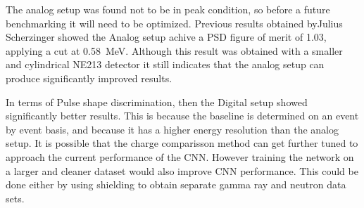 \documentclass[main.tex]{subfiles}
\begin{document}
The analog setup was found not to be in peak condition, so before a future benchmarking it will need to be optimized. Previous results obtained byJulius Scherzinger showed the Analog setup achive a PSD figure of merit of 1.03, applying a cut at \SI{0.58}{\MeV}\cite{ScherzingerPhd}. Although this result was obtained with a smaller and cylindrical NE213 detector it still indicates that the analog setup can produce significantly improved results.

In terms of Pulse shape discrimination, then the Digital setup showed significantly better results. This is because the baseline is determined on an event by event basis, and because it has a higher energy resolution than the analog setup. It is possible that the charge comparisson method can get further tuned to approach the current performance of the CNN. However training the network on a larger and cleaner dataset would also improve CNN performance. This could be done either by using shielding to obtain separate gamma ray and neutron data sets.
\end{document}
